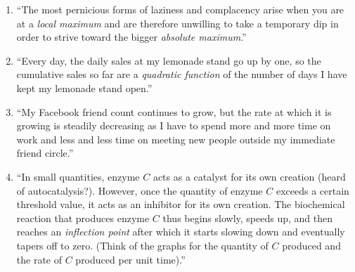 \documentclass[10pt]{amsart}
\begin{document}
\begin{enumerate}
\item ``The most pernicious forms of laziness and complacency arise
  when you are at a {\em local maximum} and are therefore unwilling to
  take a temporary dip in order to strive toward the bigger {\em absolute
  maximum}.''

  \vspace{1.5in}

\item ``Every day, the daily sales at my lemonade stand go up by one,
  so the cumulative sales so far are a {\em quadratic function} of the
  number of days I have kept my lemonade stand open.''

  \vspace{1.5in}

\item ``My Facebook friend count continues to grow, but the rate at
  which it is growing is steadily decreasing as I have to spend more
  and more time on work and less and less time on meeting new people
  outside my immediate friend circle.''

  \vspace{1in}
\item ``In small quantities, enzyme $C$ acts as a catalyst for its own
  creation (heard of autocatalysis?). However, once the quantity of
  enzyme $C$ exceeds a certain threshold value, it acts as an
  inhibitor for its own creation. The biochemical reaction that
  produces enzyme $C$ thus begins slowly, speeds up, and then reaches
  an {\em inflection point} after which it starts slowing down and
  eventually tapers off to zero. (Think of the graphs for the quantity
  of $C$ produced and the rate of $C$ produced per unit time).''

  \vspace{1.5in}

\end{enumerate}
\end{document}
